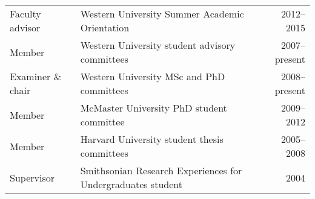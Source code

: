 \begin{tabularx}{\textwidth}{lXr}
Faculty advisor& Western University Summer Academic Orientation & 2012--2015\\
Member &Western University student advisory committees & 2007--present\\
Examiner \& chair & Western University MSc and PhD committees& 2008--present\\
Member& McMaster University PhD student committee& 2009--2012\\
Member& Harvard University student thesis committees& 2005--2008\\
Supervisor& Smithsonian Research Experiences for Undergraduates student & 2004\\
\end{tabularx}

